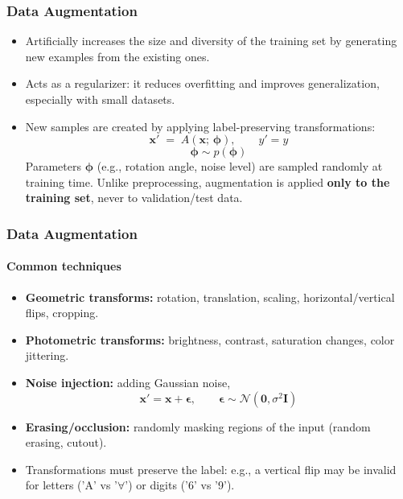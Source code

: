 \documentclass[aspectratio=169]{beamer}
\begin{document}

\begin{frame}
	\frametitle{Data Augmentation}
	\begin{itemize}
		\item Artificially increases the size and diversity of the training set by generating new examples from the existing ones.
		\item Acts as a regularizer: it reduces overfitting and improves generalization, especially with small datasets.
		\item New samples are created by applying label-preserving transformations:
		\begin{equation}
			\mathbf{x}' \;=\; A(\mathbf{x};\,\boldsymbol{\phi}),
			\qquad
			y' = y
		\end{equation}
		$$
		\boldsymbol{\phi} \sim p(\boldsymbol{\phi})
		$$
		\small Parameters $\boldsymbol{\phi}$ (e.g., rotation angle, noise level) are sampled randomly at training time. Unlike preprocessing, augmentation is applied \textbf{only to the training set}, never to validation/test data.
	\end{itemize}
\end{frame}


\begin{frame}
	\frametitle{Data Augmentation}
	\framesubtitle{Common techniques}
	\begin{itemize}
		\item \textbf{Geometric transforms:} rotation, translation, scaling, horizontal/vertical flips, cropping.
		\item \textbf{Photometric transforms:} brightness, contrast, saturation changes, color jittering.
		\item \textbf{Noise injection:} adding Gaussian noise,
		\begin{equation}
			\mathbf{x}' = \mathbf{x} + \boldsymbol{\epsilon},
			\qquad
			\boldsymbol{\epsilon} \sim \mathcal{N}(\mathbf{0}, \sigma^2 \mathbf{I})
		\end{equation}
		\item \textbf{Erasing/occlusion:} randomly masking regions of the input (random erasing, cutout).
		\item {\small Transformations must preserve the label: e.g., a vertical flip may be invalid for letters ('A' vs '$\forall$') or digits ('6' vs '9').}
	\end{itemize}
\end{frame}
\end{document}
